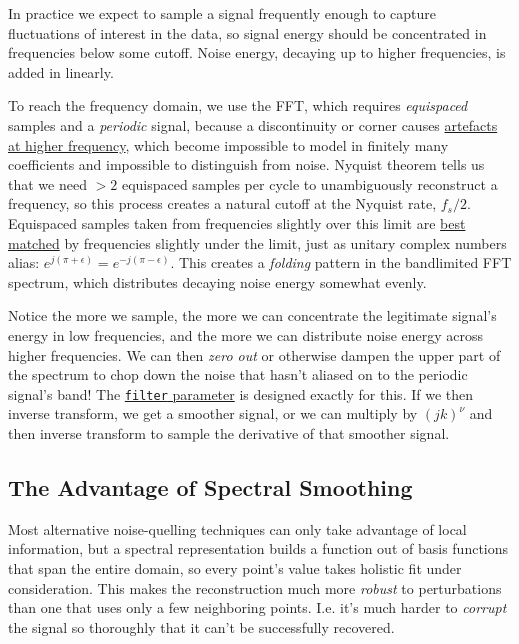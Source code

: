 \documentclass[10pt]{article}
\begin{document}
In practice we expect to sample a signal frequently enough to capture fluctuations of interest in the data, so signal energy should be concentrated in frequencies below some cutoff.  Noise energy, decaying up to higher frequencies, is added in linearly.

To reach the frequency domain, we use the FFT, which requires \textit{equispaced} samples and a \textit{periodic} signal, because a discontinuity or corner causes \hyperref[artefacts]{artefacts at higher frequency}, which become impossible to model in finitely many coefficients and impossible to distinguish from noise. Nyquist theorem\cite{oppenheim} tells us that we need $>2$ equispaced samples per cycle to unambiguously reconstruct a frequency, so this process creates a natural cutoff at the Nyquist rate, $f_s/2$. Equispaced samples taken from frequencies slightly over this limit are \hyperref[bandlimited]{best matched} by frequencies slightly under the limit, just as unitary complex numbers alias: $e^{j(\pi + \epsilon)} = e^{-j(\pi - \epsilon)}$. This creates a \textit{folding} pattern in the bandlimited FFT spectrum, which distributes decaying noise energy somewhat evenly.

Notice the more we sample, the more we can concentrate the legitimate signal's energy in low frequencies, and the more we can distribute noise energy across higher frequencies. We can then \textit{zero out} or otherwise dampen the upper part of the spectrum to chop down the noise that hasn't aliased on to the periodic signal's band! The \href{http://pavelkomarov.com/spectral-derivatives/specderiv.html}{\texttt{filter} parameter} is designed exactly for this. If we then inverse transform, we get a smoother signal, or we can multiply by $(jk)^\nu$ and then inverse transform to sample the derivative of that smoother signal.

\subsection{The Advantage of Spectral Smoothing}

Most alternative noise-quelling techniques can only take advantage of local information, but a spectral representation builds a function out of basis functions that span the entire domain, so every point's value takes holistic fit under consideration. This makes the reconstruction much more \textit{robust} to perturbations than one that uses only a few neighboring points. I.e. it's much harder to \textit{corrupt} the signal so thoroughly that it can't be successfully recovered.
\end{document}
